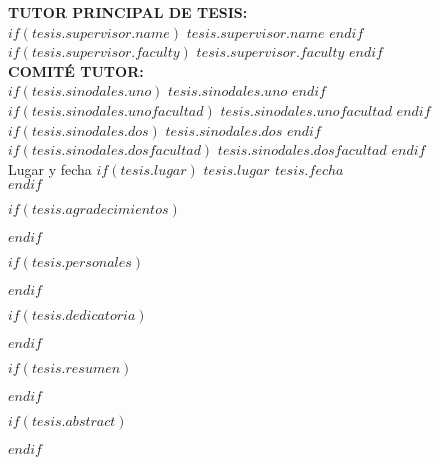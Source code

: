 \begin{titlepage}
\begin{center}
        {\small \textbf{TUTOR PRINCIPAL DE TESIS:}}\\
        {\small $if(tesis.supervisor.name)$ $tesis.supervisor.name$ $endif$}\\
        {\small $if(tesis.supervisor.faculty)$ $tesis.supervisor.faculty$ $endif$}\\[0.5cm]
        
        {\small \textbf{COMITÉ TUTOR:}}\\
        {\small $if(tesis.sinodales.uno)$ $tesis.sinodales.uno$ $endif$} {\small $if(tesis.sinodales.unofacultad)$ $tesis.sinodales.unofacultad$ $endif$}\\
        {\small $if(tesis.sinodales.dos)$ $tesis.sinodales.dos$ $endif$} {\small $if(tesis.sinodales.dosfacultad)$ $tesis.sinodales.dosfacultad$ $endif$}\\
        
        Lugar y fecha
        \vfill
        $if(tesis.lugar)$
        {\small \textbf{{$tesis.lugar$} \hfill {$tesis.fecha$}}}\\
        $endif$
        
    \end{center}
\end{titlepage}



\newpage
\begin{center}
\end{center}

\newpage
\begin{center}
\end{center}

\newpage
$if(tesis.agradecimientos)$

$endif$

\newpage
$if(tesis.personales)$

$endif$

\newpage
$if(tesis.dedicatoria)$

$endif$

\newpage
\begin{center}
\end{center}


\renewcommand*\contentsname{Tabla de contenidos}
\newpage
\tableofcontents

\newpage


\renewcommand{\listfigurename}{Lista de figuras}
\renewcommand{\listtablename}{Lista de tablas}
\listoffigures
\listoftables

\newpage
\printacronyms[name=Abreviaturas]    

\newpage
$if(tesis.resumen)$

$endif$

\newpage
$if(tesis.abstract)$

$endif$


\newpage
{}